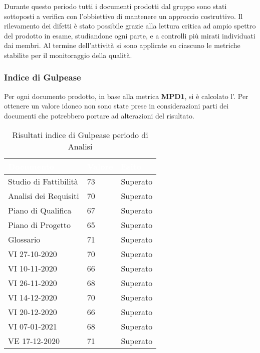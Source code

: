 Durante questo periodo tutti i documenti prodotti dal gruppo \Gruppo{} sono stati sottoposti a verifica con l'obbiettivo di mantenere un approccio costruttivo. Il rilevamento dei difetti è stato possibile grazie alla lettura critica ad ampio spettro del prodotto in esame, studiandone ogni parte, e a controlli più mirati individuati dai membri. Al termine dell'attività si sono applicate su ciascuno le metriche stabilite per il monitoraggio della qualità.

\subsubsection{Indice di Gulpease}
Per ogni documento prodotto, in base alla metrica \textbf{MPD1}, si è calcolato l'. Per ottenere un valore idoneo non sono state prese in considerazioni parti dei documenti che potrebbero portare ad alterazioni del risultato.

\renewcommand{\arraystretch}{1.5}
\begin{longtable}{C{4cm} C{2cm} C{3cm}}
\textcolor{white}{\textbf{Documento}}&
\textcolor{white}{\textbf{Valore}}&
\textcolor{white}{\textbf{Esito}}\\	
\endhead
\endfoot
{}
\caption{Risultati indice di Gulpease periodo di Analisi}
\endlastfoot

Studio di Fattibilità & 73 & Superato \\

Analisi dei Requisiti & 70 & Superato \\

Piano di Qualifica & 67 & Superato \\

Piano di Progetto & 65 & Superato \\

Glossario & 71 & Superato \\

VI 27-10-2020 & 70 & Superato \\

VI 10-11-2020 & 66 & Superato \\

VI 26-11-2020 & 68 & Superato \\

VI 14-12-2020 & 70 & Superato \\

VI 20-12-2020 & 66 & Superato \\

VI 07-01-2021 & 68 & Superato \\

VE 17-12-2020 & 71 & Superato \\
 
\end{longtable}